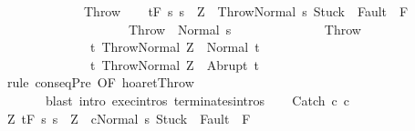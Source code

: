 \begin{isabellebody}
\ \ \ \ \ \ \isamarkupfalse%
\isanewline
\ \ \isamarkupfalse%
\isanewline
{}\isamarkupfalse%
\isanewline
\ \ \isamarkupfalse%
\ Throw\isanewline
\ \ \isamarkupfalse%
\ {\isachardoublequoteopen}{\isasymGamma}{\isacharcomma}{\isasymTheta}{\isasymturnstile}\isactrlsub t\isactrlbsub {\isacharslash}F\isactrlesub \ {\isacharbraceleft}s{\isachardot}\ s\ {\isacharequal}\ Z\ {\isasymand}\ {\isasymGamma}{\isasymturnstile}{\isasymlangle}Throw{\isacharcomma}Normal\ s{\isasymrangle}\ {\isasymRightarrow}{\isasymnotin}{\isacharparenleft}{\isacharbraceleft}Stuck{\isacharbraceright}\ {\isasymunion}\ Fault\ {\isacharbackquote}\ {\isacharparenleft}{\isacharminus}F{\isacharparenright}{\isacharparenright}\ {\isasymand}\ \isanewline
\ \ \ \ \ \ \ \ \ \ \ \ \ \ \ \ \ \ \ \ {\isasymGamma}{\isasymturnstile}Throw\ {\isasymdown}\ Normal\ s{\isacharbraceright}\isanewline
\ \ \ \ \ \ \ \ \ \ \ \ \ \ Throw\isanewline
\ \ \ \ \ \ \ \ \ \ \ \ \ \ {\isacharbraceleft}t{\isachardot}\ {\isasymGamma}{\isasymturnstile}{\isasymlangle}Throw{\isacharcomma}Normal\ Z{\isasymrangle}\ {\isasymRightarrow}\ Normal\ t{\isacharbraceright}{\isacharcomma}\isanewline
\ \ \ \ \ \ \ \ \ \ \ \ \ \ {\isacharbraceleft}t{\isachardot}\ {\isasymGamma}{\isasymturnstile}{\isasymlangle}Throw{\isacharcomma}Normal\ Z{\isasymrangle}\ {\isasymRightarrow}\ Abrupt\ t{\isacharbraceright}{\isachardoublequoteclose}\isanewline
\ \ \ \ \isamarkupfalse%
\ {\isacharparenleft}rule\ conseqPre\ {\isacharbrackleft}OF\ hoaret{\isachardot}Throw{\isacharbrackright}{\isacharparenright}\ \isanewline
\ \ \ \ \ \ \ {\isacharparenleft}blast\ intro{\isacharcolon}\ exec{\isachardot}intros\ terminates{\isachardot}intros{\isacharparenright}\isanewline
{}\isamarkupfalse%
\isanewline
\ \ \isamarkupfalse%
\ {\isacharparenleft}Catch\ c\ c\isanewline
\ \ \isamarkupfalse%
\ {\isachardoublequoteopen}{\isasymforall}Z{\isachardot}\ {\isasymGamma}{\isacharcomma}{\isasymTheta}{\isasymturnstile}\isactrlsub t\isactrlbsub {\isacharslash}F\isactrlesub \ {\isacharbraceleft}s{\isachardot}\ s\ {\isacharequal}\ Z\ {\isasymand}\ {\isasymGamma}{\isasymturnstile}{\isasymlangle}cNormal\ s{\isasymrangle}\ {\isasymRightarrow}{\isasymnotin}{\isacharparenleft}{\isacharbraceleft}Stuck{\isacharbraceright}\ {\isasymunion}\ Fault\ {\isacharbackquote}\ {\isacharparenleft}{\isacharminus}F{\isacharparenright}{\isacharparenright}\ {\isasymand}\ \isanewline

\end{isabellebody}
